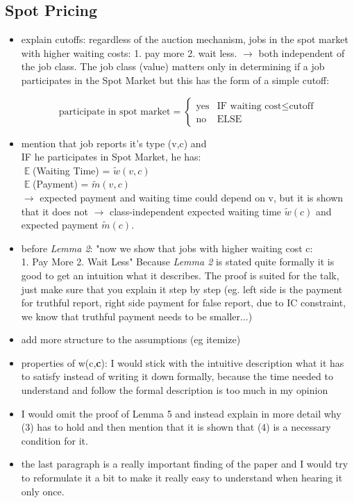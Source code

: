 \documentclass[]{article}
\begin{document}
\subsection{Spot Pricing}
\begin{itemize}
	\item explain cutoffs: regardless of the auction mechanism, jobs in the spot market with higher waiting costs: 1. pay more 2. wait less. $\rightarrow$  both independent of the job class. The job class (value) matters only in determining if a job participates in the Spot Market but this has the form of a simple cutoff: 
	
	\begin{equation*}	\text{participate in spot market} =
	\begin{cases}
	\text{yes} & \text{IF waiting cost} \leq \text{cutoff}\\
	\text{no} & \text{ELSE}
	\end{cases}
	\end{equation*}
\item mention that job reports it's type (v,c) and \\ 
IF he participates in Spot Market, he has:\\
$\mathop{\mathbb{E}}$(Waiting Time) = $\tilde{w}(v,c)$\\
$\mathop{\mathbb{E}}$(Payment) = $\tilde{m}(v,c)$\\
$\rightarrow$ expected payment and waiting time could depend on v, but it is shown that it does not  $\rightarrow$ class-independent expected waiting time $\tilde{w}(c)$ and expected payment $\tilde{m}(c)$.
\item before \emph{Lemma 2}: "now we show that jobs with higher waiting cost c:\\  1. Pay More 2. Wait Less" Because \emph{Lemma 2} is stated quite formally it is good to get an intuition what it describes. The proof is suited for the talk, just make sure that you explain it step by step (eg. left side is the payment for truthful report, right side payment for false report, due to IC constraint, we know that truthful payment needs to be smaller...)
\item add more structure to the assumptions (eg itemize)
\item properties of w(c,\textbf{c}): I would stick with the intuitive description what it has to satisfy instead of writing it down formally, because the time needed to understand and follow the formal description is too much in my opinion
\item I would omit the proof of Lemma 5 and instead explain in more detail why (3) has to hold and then mention that it is shown that (4) is a necessary condition for it.
\item the last paragraph is a really important finding of the paper and I would try to reformulate it a bit to make it really easy to understand when hearing it only  once.
\end{itemize}
\end{document}
